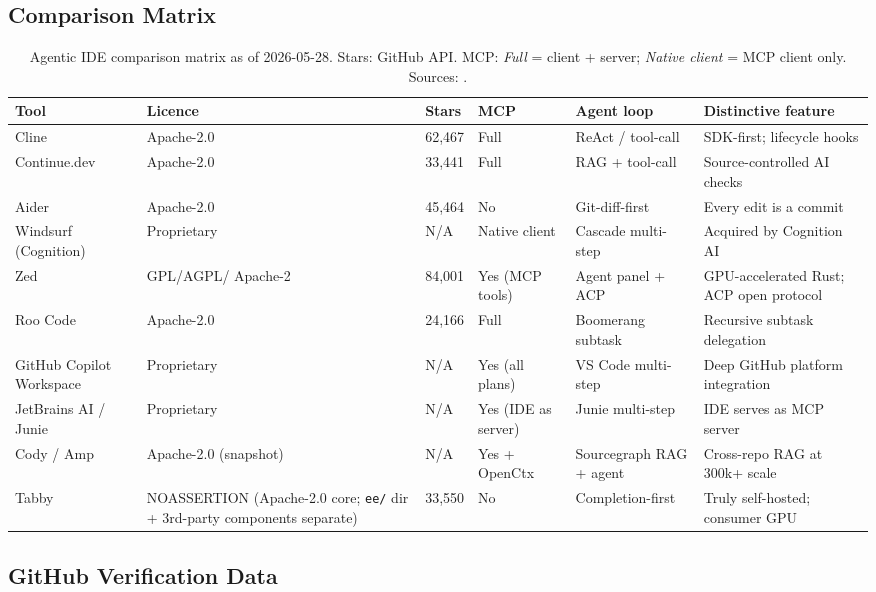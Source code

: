 \subsection{Comparison Matrix}
\label{ssec:ide-matrix}

\begin{table}[ht]
\centering
\small
\begin{tabular}{p{2.8cm} p{1.5cm} p{1.5cm} p{1.4cm} p{2.8cm} p{2.8cm}}
\hline
\textbf{Tool} & \textbf{Licence} & \textbf{Stars} & \textbf{MCP} &
  \textbf{Agent loop} & \textbf{Distinctive feature} \\
\hline
Cline & Apache-2.0 & 62,467 & Full & ReAct / tool-call & SDK-first; lifecycle hooks \\
Continue.dev & Apache-2.0 & 33,441 & Full & RAG + tool-call & Source-controlled AI checks \\
Aider & Apache-2.0 & 45,464 & No & Git-diff-first & Every edit is a commit \\
Windsurf (Cognition) & Proprietary & N/A & Native client & Cascade multi-step & Acquired by Cognition AI \\
Zed & GPL/AGPL/ Apache-2 & 84,001 & Yes (MCP tools) & Agent panel + ACP & GPU-accelerated Rust; ACP open protocol \\
Roo Code & Apache-2.0 & 24,166 & Full & Boomerang subtask & Recursive subtask delegation \\
GitHub Copilot Workspace & Proprietary & N/A & Yes (all plans) & VS Code multi-step & Deep GitHub platform integration \\
JetBrains AI / Junie & Proprietary & N/A & Yes (IDE as server) & Junie multi-step & IDE serves as MCP server \\
Cody / Amp & Apache-2.0 (snapshot) & N/A & Yes + OpenCtx & Sourcegraph RAG + agent & Cross-repo RAG at 300k+ scale \\
Tabby & NOASSERTION (Apache-2.0 core; \texttt{ee/} dir + 3rd-party components separate) & 33,550 & No & Completion-first & Truly self-hosted; consumer GPU \\
\hline
\end{tabular}
\caption{Agentic IDE comparison matrix as of 2026-05-28.
  Stars: GitHub API.  MCP: \emph{Full} = client + server; \emph{Native client} =
  MCP client only.  Sources: \cite{agentic_ide_landscape_deep}.}
\label{tab:ide-matrix}
\end{table}

\subsection{GitHub Verification Data}
\label{ssec:ide-github}

